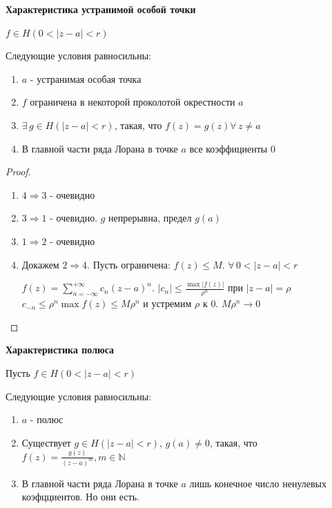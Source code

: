 \begin{theorem}
    \textbf{Характеристика устранимой особой точки}

    $f \in H(0 < |z - a| < r)$

    Следующие условия равносильны:
    \begin{enumerate}
        \item $a$ - устранимая особая точка
        \item $f$ ограничена в некоторой проколотой окрестности $a$
        \item $\exists \, g \in H(|z - a| < r)$, такая, что $f(z) = g(z) \forall \, z \neq a$
        \item В главной части ряда Лорана в точке $a$ все коэффициенты $0$
    \end{enumerate}
\end{theorem}

\begin{proof}
    \begin{enumerate}
        \item $4 \Rightarrow 3$ - очевидно
        \item $3 \Rightarrow 1$ - очевидно. $g$ непрерывна, предел $g(a)$
        \item $1 \Rightarrow 2$ - очевидно
        \item Докажем $2 \Rightarrow 4$.
        Пусть ограничена: $f(z) \leqslant M$. $\forall \, 0 < |z - a| < r$
        
        $f(z) = \sum_{n = -\infty}^{+\infty} c_n(z - a)^n$. $|c_n| \leqslant \frac{\max |f(z)|}{\rho^n}$ при $|z - a| = \rho$
        $c_{-n} \leqslant \rho^n \max f(z) \leqslant M \rho^n$ и устремим $\rho$ к $0$. $M \rho^n \rightarrow 0$
    \end{enumerate}
\end{proof}

\begin{theorem}
    \textbf{Характеристика полюса}

    Пусть $f \in H(0 < |z - a| < r)$

    Следующие условия равносильны:

    \begin{enumerate}
        \item $a$ - полюс
        \item Существует $g \in H(|z - a| < r)$, $g(a) \neq 0$, такая, что $f(z) = \frac{g(z)}{(z - a)^m}, m \in \mathbb{N}$
        \item В главной части ряда Лорана в точке $a$ лишь конечное число ненулевых коэфцциентов. Но они есть.
    \end{enumerate}
\end{theorem}

